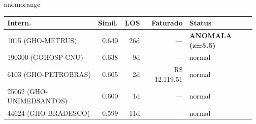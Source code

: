 \documentclass[a4paper,10pt]{article}
\begin{document}
\begin{anomalycard}[Internacao 2946 | GHO-AMIL | ALTO (z=3.63)]{anomorange}
\begin{tabular}{l r r r l}\toprule\textbf{Intern.} & \textbf{Simil.} & \textbf{LOS} & \textbf{Faturado} & \textbf{Status} \\\midrule
1015 (GHO-METRUS) & 0.640 & 26d & --- & \textcolor{anomred}{\textbf{ANOMALA (z=5.5)}} \\
190300 (GOHOSP-CNU) & 0.638 & 9d & --- & \textcolor{jcubeblue}{normal} \\
6103 (GHO-PETROBRAS) & 0.605 & 2d & R\$ 12.119,51 & \textcolor{jcubeblue}{normal} \\
25062 (GHO-UNIMEDSANTOS) & 0.600 & 1d & --- & \textcolor{jcubeblue}{normal} \\
44624 (GHO-BRADESCO) & 0.599 & 11d & --- & \textcolor{jcubeblue}{normal} \\
\bottomrule\end{tabular}


\end{anomalycard}

\newpage
\end{document}
